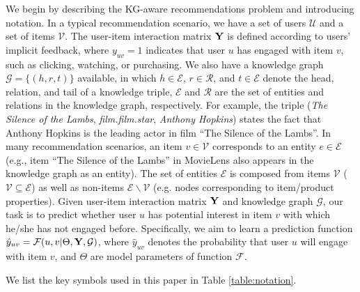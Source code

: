 \documentclass[sigconf]{acmart}
\begin{document}
	We begin by describing the KG-aware recommendations problem and introducing notation.
	In a typical recommendation scenario, we have a set of users $\mathcal U$ and a set of items $\mathcal V$.
	The user-item interaction matrix ${\bf Y}$ is defined according to users' implicit feedback, where $y_{uv} = 1$ indicates that user $u$ has engaged with item $v$, such as clicking, watching, or purchasing.
	We also have a knowledge graph $\mathcal G = \{(h, r, t)\}$ available, in which $h \in \mathcal E$, $r \in \mathcal R$, and $t \in \mathcal E$ denote the head, relation, and tail of a knowledge triple, $\mathcal E$ and $\mathcal R$ are the set of entities and relations in the knowledge graph, respectively.
	For example, the triple (\textit{The Silence of the Lambs}, \textit{film.film.star}, \textit{Anthony Hopkins}) states the fact that Anthony Hopkins is the leading actor in film ``The Silence of the Lambs''.
	In many recommendation scenarios, an item $v \in \mathcal V$ corresponds to an entity $e \in \mathcal E$ (e.g., item ``The Silence of the Lambs'' in MovieLens also appears in the knowledge graph as an entity).
	The set of entities $\mathcal E$ is composed from items $\mathcal V$ ($\mathcal V \subseteq \mathcal E$) as well as non-items $\mathcal E \backslash \mathcal V$ (e.g. nodes corresponding to item/product properties).
	Given user-item interaction matrix $\bf Y$ and knowledge graph $\mathcal G$, our task is to predict whether user $u$ has potential interest in item $v$ with which he/she has not engaged before.
	Specifically, we aim to learn a prediction function ${\hat y}_{uv} = \mathcal F(u, v | \Theta, \bf Y, \mathcal G)$, where ${\hat y}_{uv}$ denotes the probability that user $u$ will engage with item $v$, and $\Theta$ are model parameters of function $\mathcal F$.
	
	We list the key symbols used in this paper in Table \ref{table:notation}.
	
\end{document}
